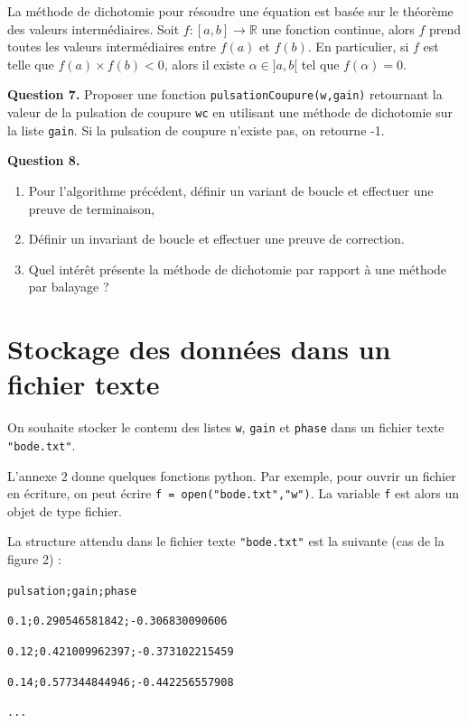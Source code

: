 \documentclass[11pt,fleqn]{book} %
\begin{document}
\begin{dBox}
La méthode de dichotomie pour résoudre une équation est basée sur le théorème des valeurs intermédiaires. Soit $f : [a,b] \to \mathbb{R}$ une fonction continue, alors $f$ prend toutes les valeurs intermédiaires entre $f(a)$ et $f(b)$.
En particulier, si $f$ est telle que $f(a) \times f(b)<0$, alors il existe $\alpha \in ]a,b[$ tel que $f(\alpha) = 0$.
\end{dBox}

\begin{tBox} 
\textbf{Question 7.} Proposer une fonction \texttt{pulsationCoupure(w,gain)} retournant la valeur de la pulsation de coupure \texttt{wc} en utilisant une méthode de dichotomie sur la liste \texttt{gain}. Si la pulsation de coupure n'existe pas, on retourne -1.
\end{tBox}


\begin{tBox} 
\textbf{Question 8.}
\begin{enumerate}
\item Pour l'algorithme précédent, définir un variant de boucle et effectuer une preuve de terminaison,
\item Définir un invariant de boucle et effectuer une preuve de correction.
\item Quel intérêt présente la méthode de dichotomie par rapport à une méthode par balayage ?
\end{enumerate}
\end{tBox}

\vfill

\section{Stockage des données dans un fichier texte}

On souhaite stocker le contenu des listes \texttt{w}, \texttt{gain} et \texttt{phase} dans un fichier texte \texttt{"bode.txt"}.

L'annexe 2 donne quelques fonctions python.
Par exemple, pour ouvrir un fichier en écriture, on peut écrire \texttt{f = open("bode.txt","w")}. La variable \texttt{f} est alors un objet de type fichier.

La structure attendu dans le fichier texte \texttt{"bode.txt"} est la suivante (cas de la figure 2) :

\begin{dBox}
\hspace{0.5 cm} \texttt{pulsation;gain;phase}

\texttt{0.1;0.290546581842;-0.306830090606}

\texttt{0.12;0.421009962397;-0.373102215459}

\texttt{0.14;0.577344844946;-0.442256557908}

\texttt{...}
\end{dBox}
\end{document}
